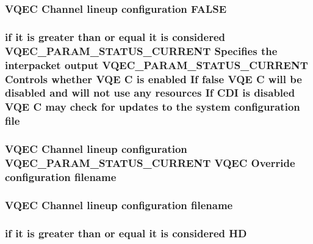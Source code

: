 \subsubsection{\setlength{\rightskip}{0pt plus 5cm}VQEC Channel lineup configuration \bf{FALSE}}\label{vqec__cfg__settings_8h_239598b47c1cdb2f6f8b047de3bb847d}


\subsubsection{\setlength{\rightskip}{0pt plus 5cm}if it is greater than or equal it is considered VQEC\_\-PARAM\_\-STATUS\_\-CURRENT Specifies the interpacket output VQEC\_\-PARAM\_\-STATUS\_\-CURRENT Controls whether VQE \bf{C} is enabled If false VQE \bf{C} will be disabled and will not use any resources If CDI is disabled VQE \bf{C} may check for updates \bf{to} the system configuration file}\label{vqec__cfg__settings_8h_326efb463a633ec8c87619288f19f948}


\subsubsection{\setlength{\rightskip}{0pt plus 5cm}VQEC Channel lineup configuration VQEC\_\-PARAM\_\-STATUS\_\-CURRENT VQEC Override configuration \bf{filename}}\label{vqec__cfg__settings_8h_41375debba13953bb40d94f90ad38cbb}


\subsubsection{\setlength{\rightskip}{0pt plus 5cm}VQEC Channel lineup configuration \bf{filename}}\label{vqec__cfg__settings_8h_9886b20026034057952daf2161f77ea9}


\subsubsection{\setlength{\rightskip}{0pt plus 5cm}if it is greater than or equal it is considered \bf{HD}}\label{vqec__cfg__settings_8h_3404cfaf7d61e875b0dae1b73f757954}


